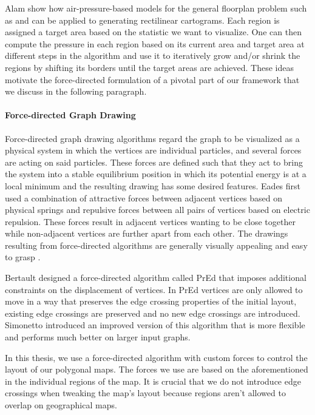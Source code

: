 Alam \etal{} \cite{alam2013computing} show how air-pressure-based models for the general floorplan problem such as \cite{izumi1998air} and \cite{felsner2013exploiting} can be applied to generating rectilinear cartograms. Each region is assigned a target area based on the statistic we want to visualize. One can then compute the pressure in each region based on its current area and target area at different steps in the algorithm and use it to iteratively grow and/or shrink the regions by shifting its borders until the target areas are achieved. These ideas motivate the force-directed formulation of a pivotal part of our framework that we discuss in the following paragraph.


\paragraph{Force-directed Graph Drawing}

Force-directed graph drawing algorithms regard the graph to be visualized as a physical system in which the vertices are individual particles, and several forces are acting on said particles. These forces are defined such that they act to bring the system into a stable equilibrium position in which its potential energy is at a local minimum and the resulting drawing has some desired features.  Eades \cite{eades84heuristic} first used a combination of attractive forces between adjacent vertices based on physical springs and repulsive forces between all pairs of vertices based on electric repulsion. These forces result in adjacent vertices wanting to be close together while non-adjacent vertices are further apart from each other. The drawings resulting from force-directed algorithms are generally visually appealing and easy to grasp \cite{kobourov2013force}.

Bertault \cite{bertault1999force} designed a force-directed algorithm called PrEd that imposes additional constraints on the displacement of vertices. In PrEd vertices are only allowed to move in a way that preserves the edge crossing properties of the initial layout, \ie{} existing edge crossings are preserved and no new edge crossings are introduced. Simonetto \etal{} \cite{simonetto2011impred} introduced an improved version of this algorithm that is more flexible and performs much better on larger input graphs.

In this thesis, we use a force-directed algorithm with custom forces to control the layout of our polygonal maps. The forces we use are based on the aforementioned  in the individual regions of the map. It is crucial that we do not introduce edge crossings when tweaking the map's layout because regions aren't allowed to overlap on geographical maps.


